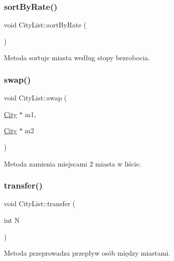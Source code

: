\mbox{\label{struct_city_list_a8d50de940f0f195ee7881fb6bed3e535}} 
\subsubsection{\texorpdfstring{sortByRate()}{sortByRate()}}
{\footnotesize\ttfamily void City\+List\+::sort\+By\+Rate (\begin{DoxyParamCaption}{ }\end{DoxyParamCaption})}



Metoda sortuje miasta według stopy bezrobocia. 

\mbox{\label{struct_city_list_a5d49c5c9885de03e75922be3936b4209}} 
\subsubsection{\texorpdfstring{swap()}{swap()}}
{\footnotesize\ttfamily void City\+List\+::swap (\begin{DoxyParamCaption}\item[{\mbox{\hyperlink{struct_city}{City}} $\ast$}]{m1,  }\item[{\mbox{\hyperlink{struct_city}{City}} $\ast$}]{m2 }\end{DoxyParamCaption})}



Metoda zamienia miejscami 2 miasta w liście. 

\mbox{\label{struct_city_list_a24e6389b175a63e25640ede4aed88021}} 
\subsubsection{\texorpdfstring{transfer()}{transfer()}}
{\footnotesize\ttfamily void City\+List\+::transfer (\begin{DoxyParamCaption}\item[{int}]{N }\end{DoxyParamCaption})}



Metoda przeprowadza przepływ osób między miastami. 



